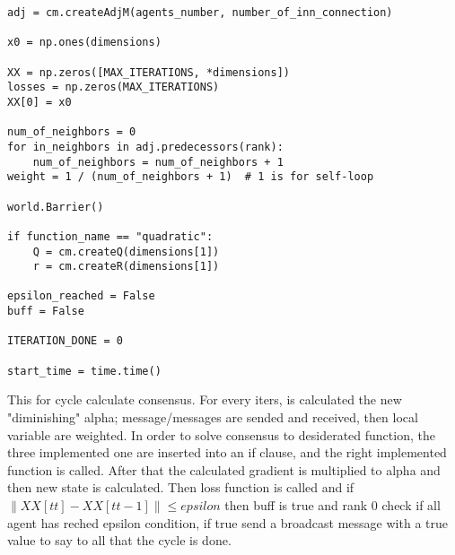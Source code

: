 \documentclass[a4paper,11pt,oneside]{book}
\begin{document}
\begin{lstlisting}
adj = cm.createAdjM(agents_number, number_of_inn_connection)

x0 = np.ones(dimensions)

XX = np.zeros([MAX_ITERATIONS, *dimensions])
losses = np.zeros(MAX_ITERATIONS)
XX[0] = x0

num_of_neighbors = 0
for in_neighbors in adj.predecessors(rank):
    num_of_neighbors = num_of_neighbors + 1
weight = 1 / (num_of_neighbors + 1)  # 1 is for self-loop

world.Barrier()

if function_name == "quadratic":
    Q = cm.createQ(dimensions[1])
    r = cm.createR(dimensions[1])

epsilon_reached = False
buff = False

ITERATION_DONE = 0

start_time = time.time()
\end{lstlisting}

This for cycle calculate consensus. For every iters, is calculated the new "diminishing" alpha; message/messages are sended and received, then
local variable are weighted. In order to solve consensus to desiderated function, the three implemented one are inserted into an if clause, and the
right implemented function is called. After that the calculated gradient is multiplied to alpha and then new state is calculated. Then loss
function is called and if $\left\lVert XX[tt] - XX[tt-1] \right\rVert \leq epsilon$ then buff is true and rank 0 check if all agent has reched
epsilon condition, if true send a broadcast message with a true value to say to all that the cycle is done.
\end{document}
